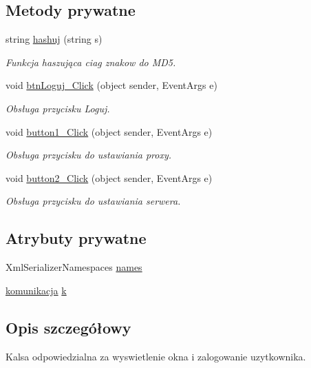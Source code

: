 \subsection*{Metody prywatne}
\begin{CompactItemize}
\item 
string \hyperlink{a00001_0041d09c2fd476393f8e19fd263676a9}{hashuj} (string s)
\begin{CompactList}\small\item\em Funkcja haszująca ciag znakow do MD5. \item\end{CompactList}\item 
void \hyperlink{a00001_e4d9f543045422d0ca31e00f855c6651}{btnLoguj\_\-Click} (object sender, EventArgs e)
\begin{CompactList}\small\item\em Obsługa przycisku Loguj. \item\end{CompactList}\item 
void \hyperlink{a00001_3afd4168471fd7bd4dbca5337d608d8e}{button1\_\-Click} (object sender, EventArgs e)
\begin{CompactList}\small\item\em Obsługa przycisku do ustawiania proxy. \item\end{CompactList}\item 
void \hyperlink{a00001_0c15aacb6337578b24d5bfac65b7261d}{button2\_\-Click} (object sender, EventArgs e)
\begin{CompactList}\small\item\em Obsługa przycisku do ustawiania serwera. \item\end{CompactList}\end{CompactItemize}
\subsection*{Atrybuty prywatne}
\begin{CompactItemize}
\item 
XmlSerializerNamespaces \hyperlink{a00001_72191f0c6adc5e4a4e11b9dd88c29487}{names}
\item 
\hyperlink{a00013}{komunikacja} \hyperlink{a00001_61c4b44659455229b617f97173f005fa}{k}
\end{CompactItemize}


\subsection{Opis szczegółowy}
Kalsa odpowiedzialna za wyswietlenie okna i zalogowanie uzytkownika. 



